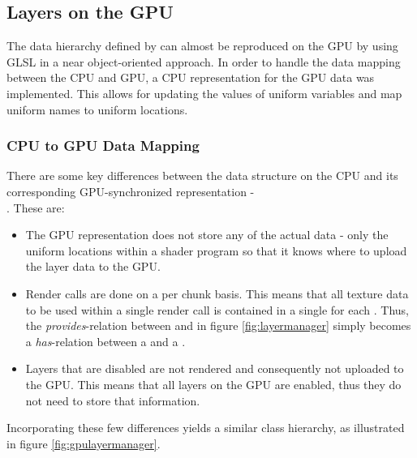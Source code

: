 \subsection{Layers on the GPU}

The data hierarchy defined by  can almost be reproduced on the GPU by using GLSL in a near object-oriented approach. In order to handle the data mapping between the CPU and GPU, a CPU representation for the GPU data was implemented. This allows for updating the values of uniform variables and map uniform names to uniform locations.

\subsubsection{CPU to GPU Data Mapping}

There are some key differences between the  data structure on the CPU and its corresponding GPU-synchronized representation - \\ . These are:

\begin{itemize}
\item The GPU representation does not store any of the actual  data - only the uniform locations within a shader program so that it knows where to upload the layer data to the GPU. 
\item Render calls are done on a per chunk basis. This means that all texture data to be used within a single render call is contained in a single  for each . Thus, the \emph{provides}-relation between  and  in figure \ref{fig:layermanager} simply becomes a \emph{has}-relation between a  and a .
\item Layers that are disabled are not rendered and consequently not uploaded to the GPU. This means that all layers on the GPU are enabled, thus they do not need to store that information.
\end{itemize}

Incorporating these few differences yields a similar class hierarchy, as illustrated in figure \ref{fig:gpulayermanager}. 

